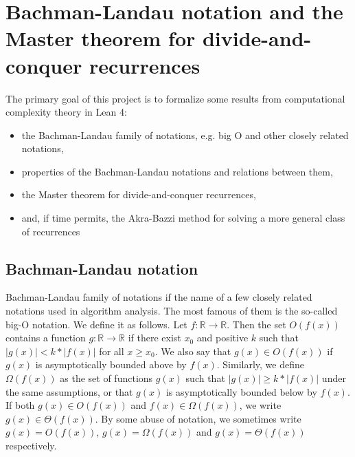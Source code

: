 %

\chapter{Bachman-Landau notation and the Master theorem for divide-and-conquer recurrences}

The primary goal of this project is to formalize some results from computational complexity theory in Lean 4:
\begin{itemize}
\item the Bachman-Landau family of notations, e.g. big O and other closely related notations,
\item properties of the Bachman-Landau notations and relations between them,
\item the Master theorem for divide-and-conquer recurrences,
\item and, if time permits, the Akra-Bazzi method for solving a more general class of recurrences
\end{itemize}

\section{Bachman-Landau notation}

Bachman-Landau family of notations if the name of a few closely related notations used in 
algorithm analysis. The most famous of them is the so-called big-O notation. We define it as 
follows. Let $f: \mathbb{R} \to \mathbb{R}$. Then the set $O(f(x))$ contains a function 
$g: \mathbb{R} \to \mathbb{R}$ if there exist $x_0$ and positive $k$ such that 
$|g(x)| < k*|f(x)|$ for all $x \ge x_0$. We also say that $g(x) \in O(f(x))$ if $g(x)$ is 
asymptotically bounded above by $f(x)$. Similarly, we define $\Omega(f(x))$ as the set of functions 
$g(x)$ such that $|g(x)| \ge k*|f(x)|$ under the same assumptions, or that $g(x)$ is asymptotically 
bounded below by $f(x)$. If both $g(x) \in O(f(x))$ and $f(x) \in \Omega(f(x))$, we write 
$g(x) \in \Theta(f(x))$. By some abuse of notation, we sometimes write 
$g(x) = O(f(x))$, $g(x) = \Omega(f(x))$ and $g(x) = \Theta(f(x))$ respectively.

